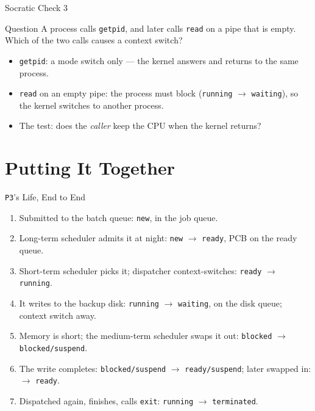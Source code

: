 \documentclass[aspectratio=169]{beamer}
\begin{document}
\begin{frame}{Socratic Check 3}
  \begin{block}{Question}
    A process calls \texttt{getpid}, and later calls \texttt{read} on a pipe
    that is empty. Which of the two calls causes a context switch?
  \end{block}
  \vspace{0.25cm}
  \begin{itemize}
    \item \texttt{getpid}: a mode switch only --- the kernel answers and
      returns to the same process.
    \item \texttt{read} on an empty pipe: the process must block
      (\texttt{running} $\to$ \texttt{waiting}), so the kernel switches to
      another process.
    \item The test: does the \emph{caller} keep the CPU when the kernel
      returns?
  \end{itemize}
\end{frame}

\section{Putting It Together}


\begin{frame}{\texttt{P3}'s Life, End to End}
  \begin{enumerate}
    \item Submitted to the batch queue: \texttt{new}, in the job queue.
    \item Long-term scheduler admits it at night: \texttt{new} $\to$
      \texttt{ready}, PCB on the ready queue.
    \item Short-term scheduler picks it; dispatcher context-switches:
      \texttt{ready} $\to$ \texttt{running}.
    \item It writes to the backup disk: \texttt{running} $\to$
      \texttt{waiting}, on the disk queue; context switch away.
    \item Memory is short; the medium-term scheduler swaps it out:
      \texttt{blocked} $\to$ \texttt{blocked/suspend}.
    \item The write completes: \texttt{blocked/suspend} $\to$
      \texttt{ready/suspend}; later swapped in: $\to$ \texttt{ready}.
    \item Dispatched again, finishes, calls \texttt{exit}: \texttt{running}
      $\to$ \texttt{terminated}.
  \end{enumerate}
\end{frame}
\end{document}
